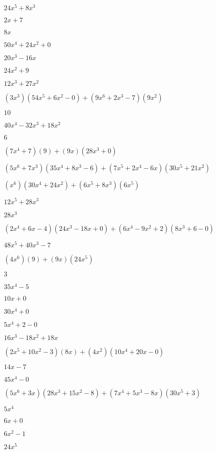 \documentclass{article}
\begin{document}
\begin{multicols}{2}
$24x^{5}+8x^{3}$\item $2x+7$\item $8x$\item $50x^{4}+24x^{2}+0$\item $20x^{3}-16x$\item $24x^{2}+9$\item $12x^{3}+27x^{2}$\item $(3x^{3})(54x^{5}+6x^{2}-0)+(9x^{6}+2x^{3}-7)(9x^{2})$\item $10$\item $40x^{4}-32x^{3}+18x^{2}$\item $6$\item $(7x^{4}+7)(9)+(9x)(28x^{3}+0)$\item $(5x^{6}+7x^{3})(35x^{4}+8x^{3}-6)+(7x^{5}+2x^{4}-6x)(30x^{5}+21x^{2})$\item $(x^{6})(30x^{4}+24x^{2})+(6x^{5}+8x^{3})(6x^{5})$\item $12x^{5}+28x^{3}$\item $28x^{3}$\item $(2x^{4}+6x-4)(24x^{3}-18x+0)+(6x^{4}-9x^2+2)(8x^{3}+6-0)$\item $48x^{5}+40x^{3}-7$\item $(4x^{6})(9)+(9x)(24x^{5})$\item $3$\item $35x^{4}-5$\item $10x+0$\item $30x^{4}+0$\item $5x^{4}+2-0$\item $16x^{3}-18x^{2}+18x$\item $(2x^{5}+10x^2-3)(8x)+(4x^2)(10x^{4}+20x-0)$\item $14x-7$\item $45x^{4}-0$\item $(5x^{6}+3x)(28x^{3}+15x^{2}-8)+(7x^{4}+5x^{3}-8x)(30x^{5}+3)$\item $5x^{4}$\item $6x+0$\item $6x^{2}-1$\item $24x^{5}$\item 
\end{multicols}
\end{document}
